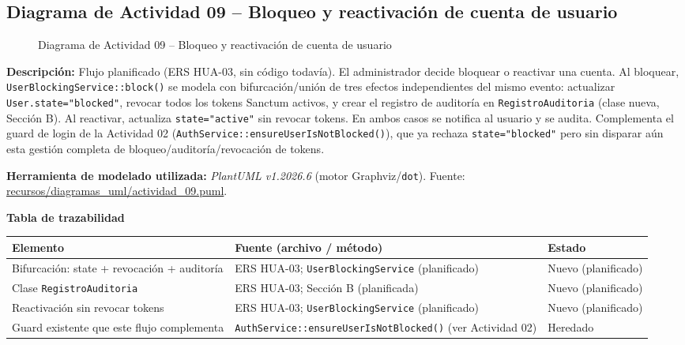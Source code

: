 \subsection{Diagrama de Actividad 09 -- Bloqueo y reactivación de cuenta de usuario}
\begin{figure}[H]
    \centering
    \caption{Diagrama de Actividad 09 -- Bloqueo y reactivación de cuenta de usuario}
    \label{fig:actividad09}
\end{figure}

{\sloppy\noindent\textbf{Descripción:} Flujo planificado (ERS HUA-03, sin código todavía). El administrador decide bloquear o reactivar una cuenta. Al bloquear, \texttt{UserBlockingService::block()} se modela con bifurcación/unión de tres efectos independientes del mismo evento: actualizar \texttt{User.state="blocked"}, revocar todos los tokens Sanctum activos, y crear el registro de auditoría en \texttt{RegistroAuditoria} (clase nueva, Sección B). Al reactivar, actualiza \texttt{state="active"} sin revocar tokens. En ambos casos se notifica al usuario y se audita. Complementa el guard de login de la Actividad 02 (\texttt{AuthService::ensureUserIsNotBlocked()}), que ya rechaza \texttt{state="blocked"} pero sin disparar aún esta gestión completa de bloqueo/auditoría/revocación de tokens.\par}

\bigskip
{\sloppy\noindent\textbf{Herramienta de modelado utilizada:} \textit{PlantUML v1.2026.6} (motor Graphviz/\texttt{dot}). Fuente: \url{recursos/diagramas_uml/actividad_09.puml}.\par}

\bigskip
\noindent\textbf{Tabla de trazabilidad}
\begin{longtable}{|L{4cm}|L{7.5cm}|M{2.3cm}|}
\hline
{} \textbf{Elemento} & \textbf{Fuente (archivo / método)} & \textbf{Estado} \\ \hline
\endhead
Bifurcación: state + revocación + auditoría & ERS HUA-03; \texttt{UserBlockingService} (planificado) & Nuevo (planificado) \\ \hline
Clase \texttt{RegistroAuditoria} & ERS HUA-03; Sección B (planificada) & Nuevo (planificado) \\ \hline
Reactivación sin revocar tokens & ERS HUA-03; \texttt{UserBlockingService} (planificado) & Nuevo (planificado) \\ \hline
Guard existente que este flujo complementa & \texttt{AuthService::ensureUserIsNotBlocked()} (ver Actividad 02) & Heredado \\ \hline
\end{longtable}
\clearpage

